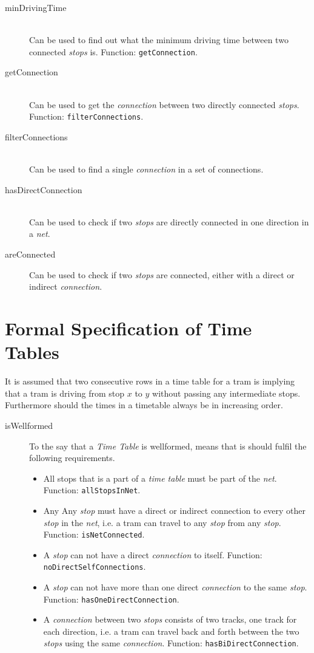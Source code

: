 \documentclass[a4]{article}
\begin{document}
\begin{description}
    \item[minDrivingTime] \hfill \\ Can be used to find out what the minimum driving time between two connected \emph{stops} is. Function: \verb=getConnection=.
    \item[getConnection] \hfill \\ Can be used to get the \emph{connection} between two directly connected \emph{stops}. Function: \verb=filterConnections=.
    \item[filterConnections] \hfill \\ Can be used to find a single \emph{connection} in a set of connections.
    \item[hasDirectConnection] \hfill \\ Can be used to check if two \emph{stops} are directly connected in one direction in a \emph{net}.
    \item[areConnected] Can be used to check if two \emph{stops} are connected, either with a direct or indirect \emph{connection}.
\end{description}  

\section{Formal Specification of Time Tables}



It is assumed that two consecutive rows in a time table for a tram is implying that a tram is driving from stop $x$ to $y$ without passing any intermediate stops. Furthermore should the times in a timetable always be in increasing order.

\begin{description}
    \item[isWellformed] \hfill To the say that a \emph{Time Table} is wellformed, means that is should fulfil the following requirements.
        \begin{itemize}
            \item All stops that is a part of a \emph{time table} must be part of the \emph{net}. Function: \verb=allStopsInNet=.
            \item Any
            Any \emph{stop} must have a direct or indirect connection to every other \emph{stop} in the \emph{net}, i.e. a tram can travel to any \emph{stop} from any \emph{stop}. Function: \verb=isNetConnected=.
            \item A \emph{stop} can not have a direct \emph{connection} to itself. Function: \verb=noDirectSelfConnections=.
            \item A \emph{stop} can not have more than one direct \emph{connection} to the same \emph{stop}. Function: \verb=hasOneDirectConnection=.
            \item A \emph{connection} between two \emph{stops} consists of two tracks, one track for each direction, i.e. a tram can travel back and forth between the two \emph{stops} using the same \emph{connection}. Function: \verb=hasBiDirectConnection=.
        \end{itemize}
\end{description}
\end{document}
